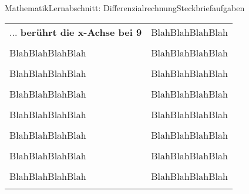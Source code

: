 \documentclass[11pt,oneside,openany,headings=optiontotoc,11pt,numbers=noenddot]{article}
\begin{document}
\begin{worksheet}{Mathematik}{Lernabschnitt: Differenzialrechnung}{Steckbriefaufgaben}
\begin{tabularx}{\textwidth}{|L{5cm}|X|}
			& \\
			\hline
			... \textbf{berührt die x-Achse bei 9} & \color{white}BlahBlahBlahBlah\\
			& \\
			\hline
			\color{white}BlahBlahBlahBlah & \color{white}BlahBlahBlahBlah\\
			& \\
			\hline
			\color{white}BlahBlahBlahBlah & \color{white}BlahBlahBlahBlah\\
			& \\
			\hline
			\color{white}BlahBlahBlahBlah & \color{white}BlahBlahBlahBlah\\
			& \\
			\hline
			\color{white}BlahBlahBlahBlah & \color{white}BlahBlahBlahBlah\\
			& \\
			\hline
			\color{white}BlahBlahBlahBlah & \color{white}BlahBlahBlahBlah\\
			& \\
			\hline
			\color{white}BlahBlahBlahBlah & \color{white}BlahBlahBlahBlah\\
			& \\
			\hline
			\color{white}BlahBlahBlahBlah & \color{white}BlahBlahBlahBlah\\
			& \\
			\hline
		\end{tabularx}
	\end{worksheet}
\end{document}
